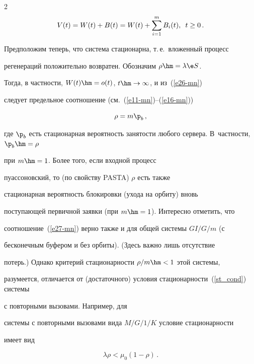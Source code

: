 \begin{multicols}{2}
\begin{equation}


V(t)=W(t)+B(t)=W(t)+\sum\limits_{i=1}^mB_i(t),\enskip t\ge0\,.


\label{e26-mn}


\end{equation}


Предположим теперь, что система стационарна, т.\,е.\ вложенный процесс


регенераций положительно возвратен. Обозначим $\rho\hm=\lambda\e S$.


Тогда, в част\-ности, $W(t)\hm=o(t)$, $t\hm\to \infty$, и из~(\ref{e26-mn})


следует  предельное соотношение (см.~(\ref{e11-mn})--(\ref{e16-mn}))


\begin{equation}


\rho= m \p_b\,,


\label{e27-mn}


\end{equation}


где $\p_b$ есть стационарная вероятность занятости любого сервера. В~част\-ности, $\p_b\hm=\rho$ 


при $m\hm =1$. Более того, если входной процесс


пуассоновский, то (по свойству PASTA)  $\rho$ есть  также


стационарная вероятность  блокировки (ухода на орбиту) вновь


поступающей первичной заявки (при $m\hm=1$).  Интересно отметить, что


соотношение~(\ref{e27-mn}) верно также и для общей сис\-те\-мы $GI/G/m$  (с


бесконечным буфером и без орбиты). (Здесь важно лишь отсутствие


потерь.) Однако критерий  стационарности $\rho/m\hm<1$ этой сис\-те\-мы,


разумеется, отличается от (достаточного) условия стационарности~(\ref{st_cond}) сис\-те\-мы 


с повторными вызовами.  Например, для


системы с повторными вызовами вида $M/G/1/K$ условие  стационарности


имеет вид


\begin{equation}


\lambda \rho<\mu_0\left(1-\rho\right)\,. 


\label{e27c-mn}



\end{equation}
\end{multicols}
